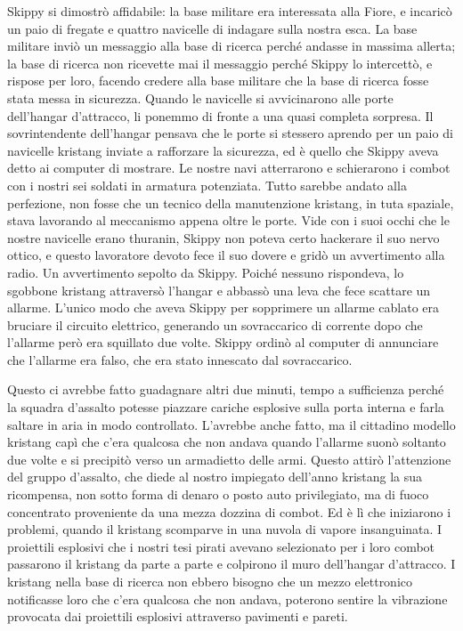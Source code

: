 Skippy si dimostrò affidabile: la base militare era interessata alla
Fiore, e incaricò un paio di fregate e quattro navicelle di indagare
sulla nostra esca. La base militare inviò un messaggio alla base di
ricerca perché andasse in massima allerta; la base di ricerca non
ricevette mai il messaggio perché Skippy lo intercettò, e rispose per
loro, facendo credere alla base militare che la base di ricerca fosse
stata messa in sicurezza. Quando le navicelle si avvicinarono alle porte
dell'hangar d'attracco, li ponemmo di fronte a una quasi completa
sorpresa. Il sovrintendente dell'hangar pensava che le porte si stessero
aprendo per un paio di navicelle kristang inviate a rafforzare la
sicurezza, ed è quello che Skippy aveva detto ai computer di mostrare.
Le nostre navi atterrarono e schierarono i combot con i nostri sei
soldati in armatura potenziata. Tutto sarebbe andato alla perfezione,
non fosse che un tecnico della manutenzione kristang, in tuta spaziale,
stava lavorando al meccanismo appena oltre le porte. Vide con i suoi
occhi che le nostre navicelle erano thuranin, Skippy non poteva certo
hackerare il suo nervo ottico, e questo lavoratore devoto fece il suo
dovere e gridò un avvertimento alla radio. Un avvertimento sepolto da
Skippy. Poiché nessuno rispondeva, lo sgobbone kristang attraversò
l'hangar e abbassò una leva che fece scattare un allarme. L'unico modo
che aveva Skippy per sopprimere un allarme cablato era bruciare il
circuito elettrico, generando un sovraccarico di corrente dopo che
l'allarme però era squillato due volte. Skippy ordinò al computer di
annunciare che l'allarme era falso, che era stato innescato dal
sovraccarico.

Questo ci avrebbe fatto guadagnare altri due minuti, tempo a sufficienza
perché la squadra d'assalto potesse piazzare cariche esplosive sulla
porta interna e farla saltare in aria in modo controllato. L'avrebbe
anche fatto, ma il cittadino modello kristang capì che c'era qualcosa
che non andava quando l'allarme suonò soltanto due volte e si precipitò
verso un armadietto delle armi. Questo attirò l'attenzione del gruppo
d'assalto, che diede al nostro impiegato dell'anno kristang la sua
ricompensa, non sotto forma di denaro o posto auto privilegiato, ma di
fuoco concentrato proveniente da una mezza dozzina di combot. Ed è lì
che iniziarono i problemi, quando il kristang scomparve in una nuvola di
vapore insanguinata. I proiettili esplosivi che i nostri tesi pirati
avevano selezionato per i loro combot passarono il kristang da parte a
parte e colpirono il muro dell'hangar d'attracco. I kristang nella base
di ricerca non ebbero bisogno che un mezzo elettronico notificasse loro
che c'era qualcosa che non andava, poterono sentire la vibrazione
provocata dai proiettili esplosivi attraverso pavimenti e pareti.

